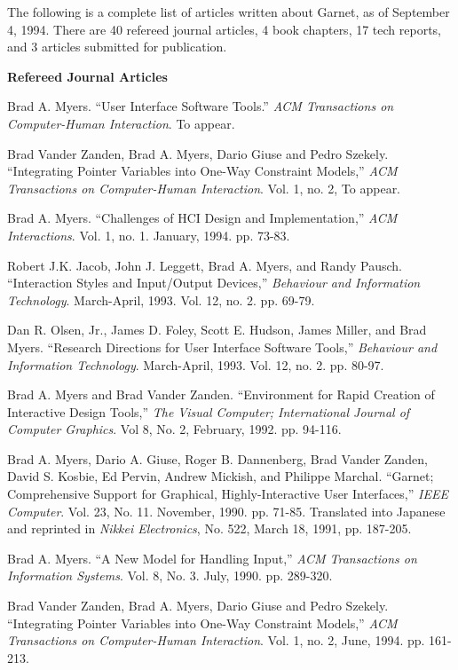 The following is a complete list of articles written about Garnet, as of
September 4, 1994.  There are 40 refereed journal articles, 4 book chapters,
17 tech reports, and 3 articles submitted for publication.


{\bf Refereed Journal Articles}

Brad A. Myers. ``User Interface Software Tools.''
{\it ACM Transactions on Computer-Human Interaction}.  To appear.

Brad Vander Zanden, Brad A. Myers, Dario Giuse and Pedro Szekely.
``Integrating Pointer Variables into One-Way Constraint Models,''
{\it ACM Transactions on Computer-Human Interaction}.  Vol. 1, no. 2,
To appear.

Brad A. Myers.  ``Challenges of HCI Design and Implementation,''
{\it ACM Interactions}.  Vol. 1, no. 1.  January, 1994.  pp. 73-83.

Robert J.K. Jacob, John J. Leggett, Brad A. Myers, and Randy Pausch.
``Interaction Styles and Input/Output Devices,'' {\it Behaviour and
Information Technology}.  March-April, 1993. Vol. 12, no. 2.  pp. 69-79.

Dan R. Olsen, Jr., James D. Foley, Scott E. Hudson, James Miller, and
Brad Myers.  ``Research Directions for User Interface Software Tools,''
{\it Behaviour and Information Technology}.  March-April, 1993. Vol. 12,
no. 2. pp. 80-97.

Brad A. Myers and Brad Vander Zanden.  ``Environment for Rapid
Creation of Interactive Design Tools,'' {\it The Visual Computer;
International Journal of Computer Graphics}. Vol 8, No. 2, February,
1992.  pp. 94-116.

Brad A. Myers, Dario A. Giuse, Roger B. Dannenberg, Brad Vander
Zanden, David S. Kosbie, Ed Pervin, Andrew Mickish, and Philippe
Marchal.  ``Garnet; Comprehensive Support for Graphical,
Highly-Interactive User Interfaces,'' {\it IEEE Computer}. Vol. 23, No.
11. November, 1990. pp. 71-85.  Translated into Japanese and reprinted
in {\it Nikkei Electronics}, No. 522, March 18, 1991, pp. 187-205.

Brad A. Myers. ``A New Model for Handling Input,'' {\it ACM Transactions
on Information Systems}.  Vol. 8, No. 3. July, 1990.  pp. 289-320.

Brad Vander Zanden, Brad A. Myers, Dario Giuse and Pedro Szekely.
``Integrating Pointer Variables into One-Way Constraint Models,''
{\it ACM Transactions on Computer-Human Interaction}.  Vol. 1, no.
2, June, 1994. pp. 161-213.



